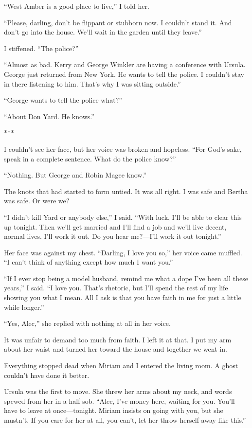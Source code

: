 {“West Amber is a good place to live,” I told her.

“Please, darling, don’t be flippant or stubborn now. I couldn’t stand it. And don’t go into the house. We’ll wait in the garden until they leave.”

I stiffened. “The police?”

“Almost as bad. Kerry and George Winkler are having a conference with Ursula. George just returned from New York. He wants to tell the police. I couldn’t stay in there listening to him. That’s why I was sitting outside.”

“George wants to tell the police what?”

“About Don Yard. He knows.”

***

I couldn’t see her face, but her voice was broken and hopeless. “For God’s sake, speak in a complete sentence. What do the police know?”

“Nothing. But George and Robin Magee know.”

The knots that had started to form untied. It was all right. I was safe and Bertha was safe. Or were we?

“I didn’t kill Yard or anybody else,” I said. “With luck, I’ll be able to clear this up tonight. Then we’ll get married and I’ll find a job and we’ll live decent, normal lives. I’ll work it out. Do you hear me?—I’ll work it out tonight.”

Her face was against my chest. “Darling, I love you so,” her voice came muffled. “I can’t think of anything except how much I want you.”

“If I ever stop being a model husband, remind me what a dope I’ve been all these years,” I said. “I love you. That’s rhetoric, but I’ll spend the rest of my life showing you what I mean. All I ask is that you have faith in me for just a little while longer.”

“Yes, Alec,” she replied with nothing at all in her voice.

It was unfair to demand too much from faith. I left it at that. I put my arm about her waist and turned her toward the house and together we went in.

Everything stopped dead when Miriam and I entered the living room. A ghost couldn’t have done it better.

Ursula was the first to move. She threw her arms about my neck, and words spewed from her in a half-sob. “Alec, I’ve money here, waiting for you. You’ll have to leave at once—tonight. Miriam insists on going with you, but she mustn’t. If you care for her at all, you can’t, let her throw herself away like this.”

}

